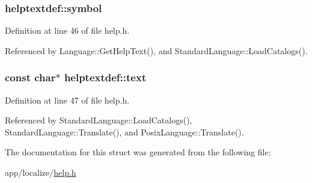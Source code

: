 \subsubsection[{\texorpdfstring{symbol}{symbol}}]{ helptextdef\+::symbol}\hypertarget{structhelptextdef_ab81d2160beaa0a3ffd69a4ec3eaa14ba}{}\label{structhelptextdef_ab81d2160beaa0a3ffd69a4ec3eaa14ba}


Definition at line 46 of file help.\+h.



Referenced by Language\+::\+Get\+Help\+Text(), and Standard\+Language\+::\+Load\+Catalogs().

\subsubsection[{\texorpdfstring{text}{text}}]{\setlength{\rightskip}{0pt plus 5cm}const char$\ast$ helptextdef\+::text}\hypertarget{structhelptextdef_af80f06e37a0841530529a97d359afba0}{}\label{structhelptextdef_af80f06e37a0841530529a97d359afba0}


Definition at line 47 of file help.\+h.



Referenced by Standard\+Language\+::\+Load\+Catalogs(), Standard\+Language\+::\+Translate(), and Posix\+Language\+::\+Translate().



The documentation for this struct was generated from the following file\+:\begin{DoxyCompactItemize}
\item 
app/localize/\hyperlink{help_8h}{help.\+h}\end{DoxyCompactItemize}
